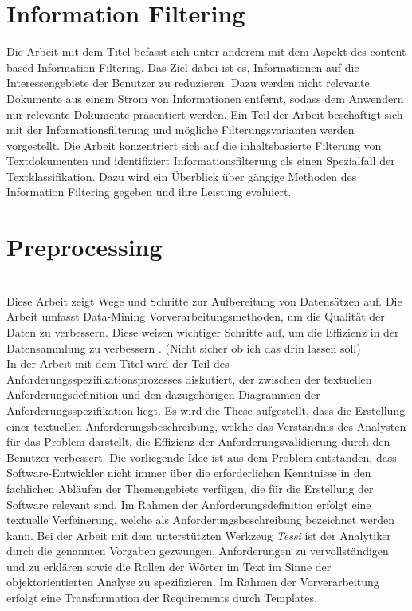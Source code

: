 
\section{Information Filtering}
Die Arbeit mit dem Titel \cite{lanquillon2001enhancing} befasst sich unter anderem mit dem Aspekt des content based Information Filtering. Das Ziel dabei ist es, Informationen auf die Interessengebiete der Benutzer zu reduzieren. Dazu werden nicht relevante Dokumente aus einem Strom von Informationen entfernt, sodass dem Anwendern nur relevante Dokumente präsentiert werden. Ein Teil der Arbeit beschäftigt sich mit der Informationsfilterung und mögliche Filterungsvarianten werden vorgestellt. Die Arbeit konzentriert sich auf die inhaltsbasierte Filterung von Textdokumenten und identifiziert Informationsfilterung als einen Spezialfall der Textklassifikation. Dazu wird ein Überblick über gängige Methoden des Information Filtering gegeben und ihre Leistung evaluiert.

\section{Preprocessing}
\\
Diese Arbeit zeigt Wege und Schritte zur Aufbereitung von Datensätzen auf. Die Arbeit umfasst Data-Mining Vorverarbeitungsmethoden, um die Qualität der Daten zu verbessern. Diese weisen wichtiger Schritte auf, um die Effizienz in der Datensammlung zu verbessern \cite{alasadi2017review}. (Nicht sicher ob ich das drin lassen soll)\\

In der Arbeit mit dem Titel \cite{kroha2000preprocessing} wird der Teil des Anforderungsspezifikationsprozesses diskutiert, der zwischen der textuellen Anforderungsdefinition und den dazugehörigen Diagrammen der Anforderungsspezifikation liegt. Es wird die These aufgestellt, dass die Erstellung einer textuellen Anforderungsbeschreibung, welche das Verständnis des Analysten für das Problem darstellt, die Effizienz der Anforderungsvalidierung durch den Benutzer verbessert. Die vorliegende Idee ist aus dem Problem entstanden, dass Software-Entwickler nicht immer über die erforderlichen Kenntnisse in den fachlichen Abläufen der Themengebiete verfügen, die für die Erstellung der Software relevant sind. Im Rahmen der Anforderungsdefinition erfolgt eine textuelle Verfeinerung, welche als Anforderungsbeschreibung bezeichnet werden kann. Bei der Arbeit mit dem unterstützten Werkzeug \emph{Tessi} ist der Analytiker durch die genannten Vorgaben gezwungen, Anforderungen zu vervollständigen und zu erklären sowie die Rollen der Wörter im Text im Sinne der objektorientierten Analyse zu spezifizieren. Im Rahmen der Vorverarbeitung erfolgt eine Transformation der Requirements durch Templates.

